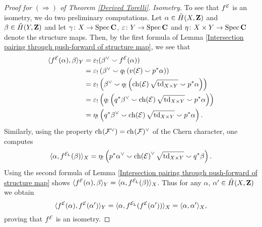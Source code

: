 \begin{proof}[Proof for $(\Rightarrow)$ of Theorem \ref{Derived Torelli}]
    \noindent
    \textsl{Isometry.}
    To see that $f^{\mathcal E}$ is an isometry, we do two preliminary computations. Let $\alpha \in \,\tilde{\!{H}}(X, \mathbf Z)$ and $\beta \in \,\tilde{\!{H}}(Y, \mathbf Z)$ and let $\gamma \colon X \to \operatorname{Spec}\mathbf C$, $\varepsilon \colon Y \to \operatorname{Spec}\mathbf C$ and $\eta \colon X \times Y \to \operatorname{Spec}\mathbf C$ denote the structure maps. Then, by the first formula of Lemma \ref{Intersection pairing through push-forward of structure map}, we see that
    \begin{align*}
        \pairing{\fmcoh{\E}(\alpha)}{\beta}_Y &= \varepsilon_!(\beta^\vee \smallsmile \fmcoh{\E}(\alpha))
        \\
        &= \varepsilon_!\left(
            \beta^\vee \smallsmile q_!\left(v(\E) \smallsmile p^*\alpha\right)\right) 
        \\
        &= \varepsilon_!\left(
            \beta^\vee \smallsmile q_!\left(\ch{\E}
            {\sqrt{\tdclass{X \times Y}}}
            \smallsmile p^*\alpha\right)
        \right) 
        \\
        &= \varepsilon_!\left( 
            q_!\left(
                q^*\beta^\vee \smallsmile \ch{\E}
                {\sqrt{\tdclass{X \times Y}}}
                \smallsmile p^*\alpha
            \right)
        \right) \\
        &= \eta_!\left(
            q^*\beta^\vee \smallsmile \ch{\E}
                {\sqrt{\tdclass{X \times Y}}}
                \smallsmile p^*\alpha
        \right).
    \end{align*}
    Similarly, using the property $\ch[](\F^\vee) = \ch[](\F)^\vee$ of the Chern character, one computes
    \[
        \pairing{\alpha}{\fmcoh{\ladj{\E}}(\beta)}_X = \eta_!\left(
            p^*\alpha^\vee \smallsmile \ch{\E}^\vee
                {\sqrt{\tdclass{X \times Y}}}
                \smallsmile q^*\beta
        \right).
    \]
    Using the second formula of Lemma \ref{Intersection pairing through push-forward of structure map} shows $\langle f^{\mathcal E}(\alpha), \beta \rangle_Y = \langle \alpha, f^{\mathcal E_\mathrm{L}}(\beta) \rangle_X$.
    Thus for any $\alpha$, $\alpha' \in \,\tilde{\!{H}}(X, \mathbf Z)$ we obtain
    \[
        \langle f^{\mathcal E}(\alpha), f^{\mathcal E}(\alpha') \rangle_Y = 
        \langle \alpha, f^{\mathcal E_\mathrm{L}}(f^{\mathcal E}(\alpha')) \rangle_X = 
        \langle \alpha, \alpha' \rangle_X,
    \]       
    proving that $f^{\mathcal E}$ is an isometry. 



\end{proof}
